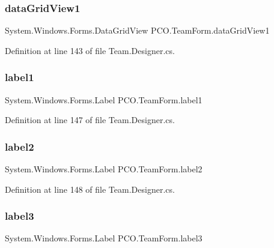 \subsubsection{\texorpdfstring{data\+Grid\+View1}{dataGridView1}}
{\footnotesize\ttfamily System.\+Windows.\+Forms.\+Data\+Grid\+View P\+C\+O.\+Team\+Form.\+data\+Grid\+View1\hspace{0.3cm}{\ttfamily [private]}}



Definition at line 143 of file Team.\+Designer.\+cs.

\mbox{\label{classPCO_1_1TeamForm_a634d907c5d6a0db9663987c84376a042}} 
\subsubsection{\texorpdfstring{label1}{label1}}
{\footnotesize\ttfamily System.\+Windows.\+Forms.\+Label P\+C\+O.\+Team\+Form.\+label1\hspace{0.3cm}{\ttfamily [private]}}



Definition at line 147 of file Team.\+Designer.\+cs.

\mbox{\label{classPCO_1_1TeamForm_afcf78574df7b1257a7b1f9122ff1d929}} 
\subsubsection{\texorpdfstring{label2}{label2}}
{\footnotesize\ttfamily System.\+Windows.\+Forms.\+Label P\+C\+O.\+Team\+Form.\+label2\hspace{0.3cm}{\ttfamily [private]}}



Definition at line 148 of file Team.\+Designer.\+cs.

\mbox{\label{classPCO_1_1TeamForm_ac1175e060b42b00c8a1d2e40688cdcbf}} 
\subsubsection{\texorpdfstring{label3}{label3}}
{\footnotesize\ttfamily System.\+Windows.\+Forms.\+Label P\+C\+O.\+Team\+Form.\+label3\hspace{0.3cm}{\ttfamily [private]}}




